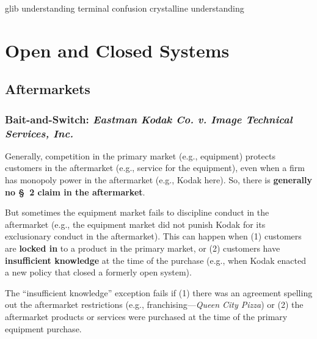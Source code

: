 glib understanding
terminal confusion
crystalline understanding

\section{Open and Closed Systems}

\subsection{Aftermarkets}

\subsubsection{Bait-and-Switch: \emph{Eastman Kodak Co. v. Image Technical 
Services, Inc.}}

Generally, competition in the primary market (e.g., equipment) protects 
customers in the aftermarket (e.g., service for the equipment), even when a 
firm has monopoly power in the aftermarket (e.g., Kodak here). So, there is 
\textbf{generally no \S\ 2 claim in the aftermarket}.

But sometimes the equipment market fails to discipline conduct in the 
aftermarket (e.g., the equipment market did not punish Kodak for its 
exclusionary conduct in the aftermarket). This can happen when (1) customers 
are \textbf{locked in} to a product in the primary market, or (2) customers 
have \textbf{insufficient knowledge} at the time of the purchase (e.g., when 
Kodak enacted a new policy that closed a formerly open system).

The ``insufficient knowledge'' exception fails if (1) there was an agreement 
spelling out the aftermarket restrictions (e.g., franchising---\emph{Queen 
City Pizza}) or (2) the aftermarket products or services were purchased at the 
time of the primary equipment purchase.

